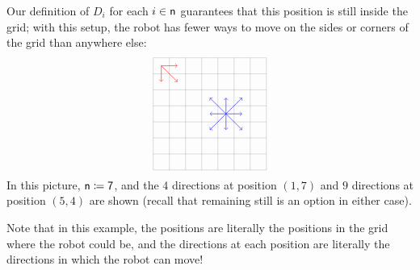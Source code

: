 \documentclass[Book-Poly]{subfiles}
\begin{document}
\begin{example}
Our definition of $D_i$ for each $i\in\mathsf{n}$ guarantees that this position is still inside the grid; with this setup, the robot has fewer ways to move on the sides or corners of the grid than anywhere else:
\[
\begin{tikzpicture}[scale=.5]
  \draw[step=1cm,gray,very thin] (-3,-3) grid (4,4);
	\draw[->, red ] (-2.5,3.5) -- (-1.5, 3.5);
	\draw[->, red ] (-2.5,3.5) -- (-1.5, 2.5);
	\draw[->, red ] (-2.5,3.5) -- (-2.5, 2.5);
	\draw[->, blue] (1.5, 0.5) -- (0.5, 0.5);
	\draw[->, blue] (1.5, 0.5) -- (2.5, 0.5);
	\draw[->, blue] (1.5, 0.5) -- (1.5, 1.5);
	\draw[->, blue] (1.5, 0.5) -- (1.5,-0.5);
	\draw[->, blue] (1.5, 0.5) -- (0.5, 1.5);
	\draw[->, blue] (1.5, 0.5) -- (0.5,-0.5);
	\draw[->, blue] (1.5, 0.5) -- (2.5, 1.5);
	\draw[->, blue] (1.5, 0.5) -- (2.5,-0.5);
\end{tikzpicture}
\]
In this picture, $\mathsf{n}\coloneqq\textsf{7}$, and the $4$ directions at position $(1,7)$ and $9$ directions at position $(5,4)$ are shown (recall that remaining still is an option in either case).

Note that in this example, the positions are literally the positions in the grid where the robot could be, and the directions at each position are literally the directions in which the robot can move!
\end{example}
\end{document}
